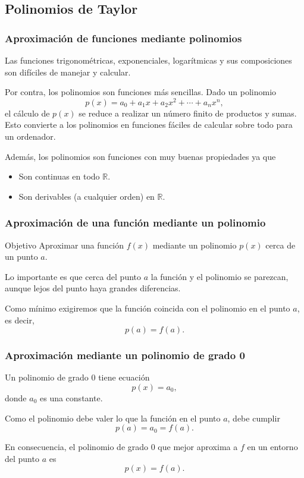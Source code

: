 \subsection{Polinomios de Taylor}
\begin{frame}
\frametitle{Aproximación de funciones mediante polinomios}
Las funciones trigonométricas, exponenciales, logarítmicas y sus composiciones son difíciles de manejar y calcular.

Por contra, los polinomios son funciones más sencillas. Dado un polinomio
\[
p(x) = a_0+a_1x+a_2x^2+\cdots+a_nx^n,
\]
el cálculo de $p(x)$ se reduce a realizar un número finito de productos y sumas. Esto convierte a los polinomios en funciones fáciles de calcular sobre todo para un ordenador.

Además, los polinomios son funciones con muy buenas propiedades ya que
\begin{itemize}
\item Son continuas en todo $\mathbb{R}$.
\item Son derivables (a cualquier orden) en $\mathbb{R}$.
\end{itemize}
\end{frame}


\begin{frame}
\frametitle{Aproximación de una función mediante un polinomio}
\begin{block}{Objetivo}
Aproximar una función $f(x)$ mediante un polinomio $p(x)$ cerca de un punto $a$.
\end{block}

Lo importante es que cerca del punto $a$ la función y el polinomio se parezcan, aunque lejos del punto haya grandes diferencias.

Como mínimo exigiremos que la función coincida con el polinomio en el punto $a$, es decir, \[p(a)=f(a).\]
\end{frame}


\begin{frame}
\frametitle{Aproximación mediante un polinomio de grado 0}
Un polinomio de grado 0 tiene ecuación
\[
p(x) = a_0,
\]
donde $a_0$ es una constante.

Como el polinomio debe valer lo que la función en el punto $a$, debe cumplir
\[p(a) = a_0 = f (a).\]

En consecuencia, el polinomio de grado 0 que mejor aproxima a $f$ en un entorno del punto $a$ es
\[p(x) = f (a).\]
\end{frame}



